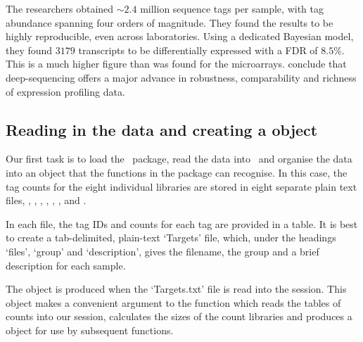 The researchers obtained $\sim2.4$ million sequence tags per sample,
with tag abundance spanning four orders of magnitude. They found the
results to be highly reproducible, even across laboratories. Using a
dedicated Bayesian model, they found $3179$ transcripts to be
differentially expressed with a FDR of $8.5$\%. This is a much higher
figure than was found for the microarrays. \citet{THoen:2008p9}
conclude that deep-sequencing offers a major advance in robustness,
comparability and richness of expression profiling data.


\subsection{Reading in the data and creating a  object}
Our first task is to load the \edgeR~package, read the data into
\R~and organise the data into an object that the functions in the
package can recognise. In this case, the tag counts for the eight
individual libraries are stored in eight separate plain text files,
, , ,
, , ,
 and .

In each file, the tag IDs and counts for each tag are provided in a
table. It is best to create a tab-delimited, plain-text `Targets'
file, which, under the headings `files', `group' and `description',
gives the filename, the group and a brief description for each sample.

The  object is produced when the `Targets.txt' file is
read into the  session. This object makes a convenient
argument to the function  which reads the tables of
counts into our  session, calculates the sizes of the count
libraries and produces a  object for use by subsequent
functions.

